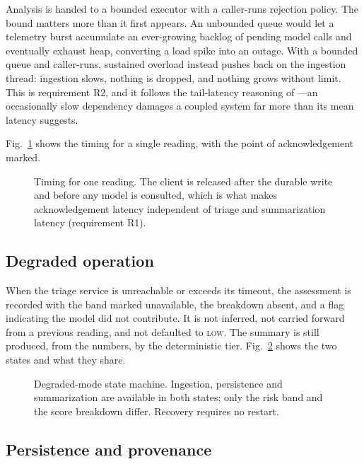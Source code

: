 \documentclass[lettersize,journal]{IEEEtran}
\begin{document}
Analysis is handed to a bounded executor with a caller-runs rejection policy.
The bound matters more than it first appears. An unbounded queue would let a
telemetry burst accumulate an ever-growing backlog of pending model calls and
eventually exhaust heap, converting a load spike into an outage. With a bounded
queue and caller-runs, sustained overload instead pushes back on the ingestion
thread: ingestion slows, nothing is dropped, and nothing grows without limit.
This is requirement R2, and it follows the tail-latency reasoning of
\cite{dean2013}---an occasionally slow dependency damages a coupled system far
more than its mean latency suggests.

Fig.~\ref{fig:sequence} shows the timing for a single reading, with the point of
acknowledgement marked.

\begin{figure}[t]
\centering
\resizebox{\textwidth}{!}{}
\caption{Timing for one reading. The client is released after the durable write
and before any model is consulted, which is what makes acknowledgement latency
independent of triage and summarization latency (requirement R1).}
\label{fig:sequence}
\end{figure}

\subsection{Degraded operation}

When the triage service is unreachable or exceeds its timeout, the assessment is
recorded with the band marked unavailable, the breakdown absent, and a flag
indicating the model did not contribute. It is not inferred, not carried forward
from a previous reading, and not defaulted to \textsc{low}. The summary is still
produced, from the numbers, by the deterministic tier.
Fig.~\ref{fig:states} shows the two states and what they share.

\begin{figure}[t]
\centering

\caption{Degraded-mode state machine. Ingestion, persistence and summarization
are available in both states; only the risk band and the score breakdown
differ. Recovery requires no restart.}
\label{fig:states}
\end{figure}

\subsection{Persistence and provenance}
\end{document}
